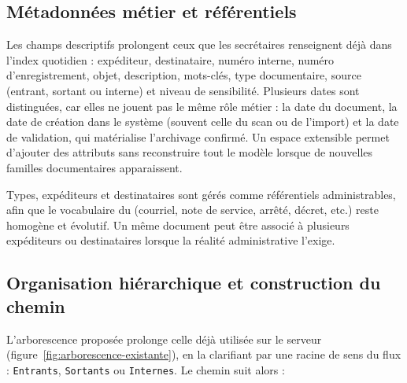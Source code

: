 \subsection{Métadonnées métier et référentiels}

Les champs descriptifs prolongent ceux que les secrétaires renseignent déjà dans l'index quotidien : expéditeur, destinataire, numéro interne, numéro d'enregistrement, objet, description, mots-clés, type documentaire, source (entrant, sortant ou interne) et niveau de sensibilité. Plusieurs dates sont distinguées, car elles ne jouent pas le même rôle métier : la date du document, la date de création dans le système (souvent celle du scan ou de l'import) et la date de validation, qui matérialise l'archivage confirmé. Un espace extensible permet d'ajouter des attributs sans reconstruire tout le modèle lorsque de nouvelles familles documentaires apparaissent.

Types, expéditeurs et destinataires sont gérés comme référentiels administrables, afin que le vocabulaire du \nomMinistere{} (courriel, note de service, arrêté, décret, etc.) reste homogène et évolutif. Un même document peut être associé à plusieurs expéditeurs ou destinataires lorsque la réalité administrative l'exige.

\subsection{Organisation hiérarchique et construction du chemin}

L'arborescence proposée prolonge celle déjà utilisée sur le serveur (figure~\ref{fig:arborescence-existante}), en la clarifiant par une racine de sens du flux : \texttt{Entrants}, \texttt{Sortants} ou \texttt{Internes}. Le chemin suit alors :

\begin{center}
\begingroup
{}
\endgroup
\end{center}

